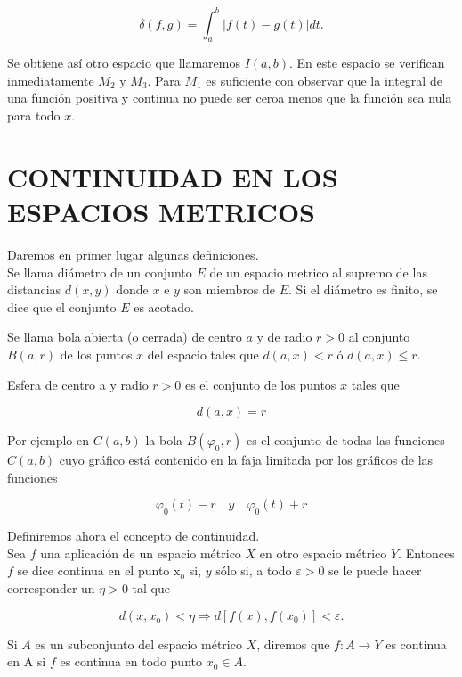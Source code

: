 \documentclass[10pt]{article}
\theoremstyle{plain}
\theoremstyle{definition}
\theoremstyle{remark}
\begin{document}
\begin{equation*}
\delta(f, g)=\int_{a}^{b}|f(t)-g(t)| d t . \tag{$1\cdot3$}
\end{equation*}


Se obtiene así otro espacio que llamaremos $I(a, b)$. En este espacio se verifican inmediatamente $M_{2}$ y $M_{3}$. Para $M_{1}$ es suficiente con observar que la integral de una función positiva y continua no puede ser ceroa menos que la función sea nula para todo $x$.

\section*{CONTINUIDAD EN LOS ESPACIOS METRICOS}
Daremos en primer lugar algunas definiciones.\\
Se llama diámetro de un conjunto $E$ de un espacio metrico al supremo de las distancias $d(x, y)$ donde $x$ e $y$ son miembros de $E$. Si el diámetro es finito, se dice que el conjunto $E$ es acotado.

Se llama bola abierta (o cerrada) de centro $a$ y de radio $r>0$ al conjunto $B(a, r)$ de los puntos $x$ del espacio tales que $d(a, x)<r$ ó $d(a, x) \leqslant r$.

Esfera de centro a y radio $r>0$ es el conjunto de los puntos $x$ tales que

$$
d(a, x)=r
$$

Por ejemplo en $C(a, b)$ la bola $B\left(\varphi_{0}, r\right)$ es el conjunto de todas las funciones $C(a, b)$ cuyo gráfico está contenido en la faja limitada por los gráficos de las funciones

$$
\varphi_{0}(t)-r \quad y \quad \varphi_{0}(t)+r
$$

Definiremos ahora el concepto de continuidad.\\
Sea $f$ una aplicación de un espacio métrico $X$ en otro espacio métrico $Y$. Entonces $f$ se dice continua en el punto $\mathrm{x}_{\mathrm{o}}$ si, $y$ sólo si, a todo $\varepsilon>0$ se le puede hacer corresponder un $\eta>0$ tal que


\begin{equation*}
d\left(x, x_{\mathrm{o}}\right)<\eta \Rightarrow d\left[f(x), f\left(x_{0}\right)\right]<\varepsilon . \tag{1-4}
\end{equation*}


Si $A$ es un subconjunto del espacio métrico $X$, diremos que $f: A \rightarrow Y$ es continua en A si $f$ es continua en todo punto $x_{0} \in A$.
\end{document}
